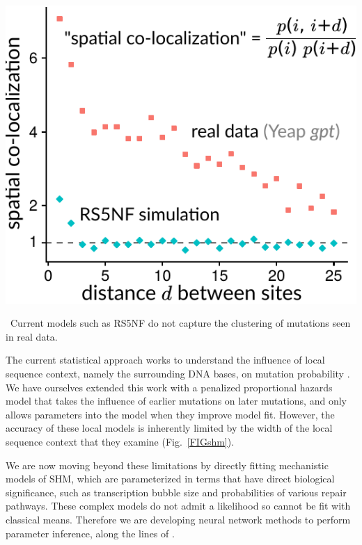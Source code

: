 \documentclass[nobib]{tufte-handout}
\begin{document}
\begin{marginfigure}[0.7in]%
\begin{centering}
    \includegraphics[width=\textwidth]{spatial-co-localization}
\end{centering}
  \caption{\
   Current models such as RS5NF \cite{Cui2016-wz} do not capture the clustering of mutations seen in real data.
    }
  \label{FIGshm}
\end{marginfigure}%

The current statistical approach works to understand the influence of local sequence context, namely the surrounding DNA bases, on mutation probability \cite{Rogozin1992-xv,Yaari2013-dg,Cui2016-wz}.
We have ourselves extended this work with a penalized  proportional hazards model \cite{Feng2019-sj} that takes the influence of earlier mutations on later mutations, and only allows parameters into the model when they improve model fit.
However, the accuracy of these local models is inherently limited by the width of the local sequence context that they examine (Fig.~\ref{FIGshm}).

We are now moving beyond these limitations by directly fitting mechanistic models of SHM, which are parameterized in terms that have direct biological significance, such as transcription bubble size and probabilities of various repair pathways.
These complex models do not admit a likelihood so cannot be fit with classical means.
Therefore we are developing neural network methods to perform parameter inference, along the lines of \cite{Chan2018-qq}.
\end{document}
